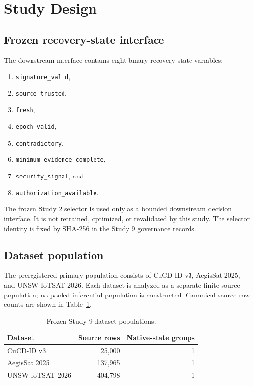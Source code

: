 \documentclass[preprint,12pt]{elsarticle}
\begin{document}
\section{Study Design}

\subsection{Frozen recovery-state interface}

The downstream interface contains eight binary recovery-state variables:
\begin{enumerate}[label=(\arabic*)]
    \item \texttt{signature\_valid},
    \item \texttt{source\_trusted},
    \item \texttt{fresh},
    \item \texttt{epoch\_valid},
    \item \texttt{contradictory},
    \item \texttt{minimum\_evidence\_complete},
    \item \texttt{security\_signal}, and
    \item \texttt{authorization\_available}.
\end{enumerate}

The frozen Study 2 selector is used only as a bounded downstream decision interface. It is not retrained, optimized, or revalidated by this study. The selector identity is fixed by SHA-256 in the Study 9 governance records.

\subsection{Dataset population}

The preregistered primary population consists of CuCD-ID v3, AegisSat 2025, and UNSW-IoTSAT 2026. Each dataset is analyzed as a separate finite source population; no pooled inferential population is constructed. Canonical source-row counts are shown in Table~\ref{tab:datasets}.

\begin{table}[htbp]
\centering
\caption{Frozen Study 9 dataset populations.}
\label{tab:datasets}
\begin{tabular}{lrr}
\toprule
Dataset & Source rows & Native-state groups \\
\midrule
CuCD-ID v3 & 25,000 & 1 \\
AegisSat 2025 & 137,965 & 1 \\
UNSW-IoTSAT 2026 & 404,798 & 1 \\
\bottomrule
\end{tabular}
\end{table}
\end{document}
